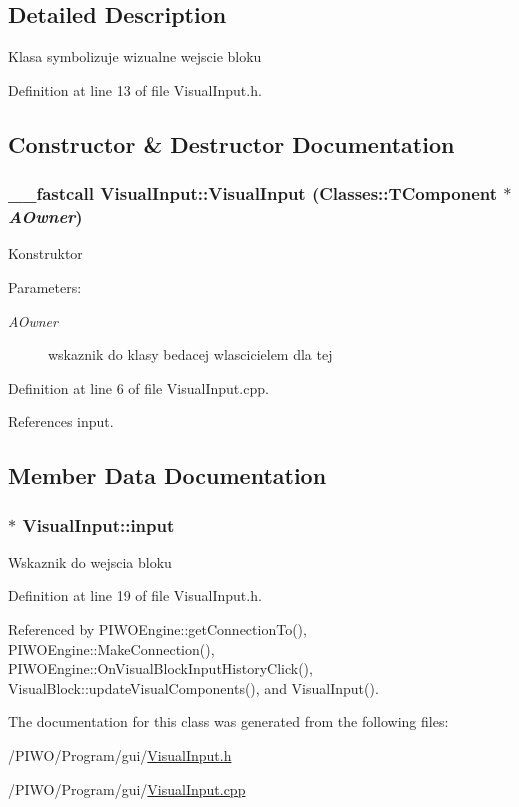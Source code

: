 \subsection{Detailed Description}
Klasa symbolizuje wizualne wejscie bloku 

Definition at line 13 of file VisualInput.h.

\subsection{Constructor \& Destructor Documentation}
\hypertarget{classVisualInput_a4321580033604ae3c7b951b8061b8b5}{
\subsubsection[VisualInput]{\setlength{\rightskip}{0pt plus 5cm}\_\-\_\-fastcall VisualInput::VisualInput (Classes::TComponent $\ast$ {\em AOwner})}}
\label{classVisualInput_a4321580033604ae3c7b951b8061b8b5}


Konstruktor \begin{Desc}
\item[Parameters:]
\begin{description}
\item[{\em AOwner}]wskaznik do klasy bedacej wlascicielem dla tej \end{description}
\end{Desc}


Definition at line 6 of file VisualInput.cpp.

References input.

\subsection{Member Data Documentation}
\hypertarget{classVisualInput_28567cf4de37faa89c1af357c19677e8}{
\subsubsection[input]{$\ast$ {\bf VisualInput::input}}}
\label{classVisualInput_28567cf4de37faa89c1af357c19677e8}


Wskaznik do wejscia bloku 

Definition at line 19 of file VisualInput.h.

Referenced by PIWOEngine::getConnectionTo(), PIWOEngine::MakeConnection(), PIWOEngine::OnVisualBlockInputHistoryClick(), VisualBlock::updateVisualComponents(), and VisualInput().

The documentation for this class was generated from the following files:\begin{CompactItemize}
\item 
/PIWO/Program/gui/\hyperlink{VisualInput_8h}{VisualInput.h}\item 
/PIWO/Program/gui/\hyperlink{VisualInput_8cpp}{VisualInput.cpp}\end{CompactItemize}

